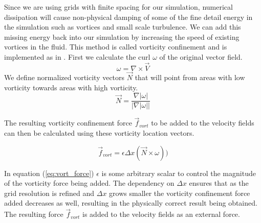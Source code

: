 Since we are using grids with finite spacing for our simulation, numerical dissipation will cause non-physical damping of some of the fine detail energy in the simulation such as vortices and small scale turbulence. We can add this missing energy back into our simulation by increasing the speed of existing vortices in the fluid. This method is called vorticity confinement and is implemented as in \cite{Nguyen02}. First we calculate the curl $\omega$ of the original vector field.
\begin{equation}
\label{eq:vorticity}
\omega = \nabla \times \vec{V}
\end{equation}
We define normalized vorticity vectors $\vec{N}$ that will point from areas with low vorticity towards areas with high vorticity.
\begin{equation}
\label{eq:vort_loc_vec}
\vec{N} = \frac{\nabla |\omega|}{|\nabla |\omega ||}
\end{equation}

The resulting vorticity confinement force $\vec{f}_{vort}$ to be added to the velocity fields can then be calculated using these vorticity location vectors.

\begin{equation}
\label{eq:vort_force}
	\vec{f}_{vort} = \epsilon\Delta x(\vec{N}\times\omega))
\end{equation}

In equation (\ref{eq:vort_force}) $\epsilon$ is some arbitrary scalar to control the magnitude of the vorticity force being added. The dependency on $\Delta x$ ensures that as the grid resolution is refined and $\Delta x$ grows smaller the vorticity confinement force added decreases as well, resulting in the physically correct result being obtained. The resulting force $\vec{f}_{vort}$ is added to the velocity fields as an external force.